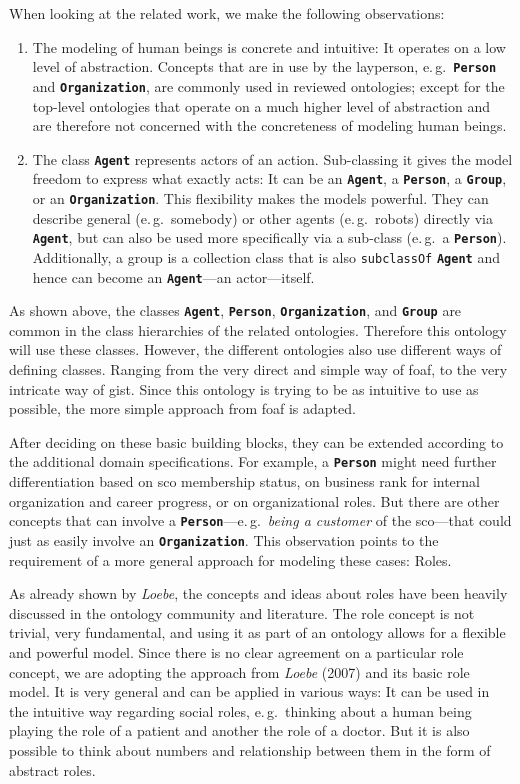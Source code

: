 \documentclass[a4paper, DIV=13, BCOR=0cm]{scrbook}
\newcommand{\eg}{e.\,g.\ }
\newcommand{\class}[1]{\texttt{\textbf{#1}}}
\newcommand{\relation}[1]{\texttt{#1}}
\begin{document}
When looking at the related work, we make the following observations:
\begin{enumerate}
	\item The modeling of human beings is concrete and intuitive: It operates on a low level of abstraction. Concepts that are in use by the layperson, \eg \class{Person} and \class{Organization}, are commonly used in reviewed ontologies; except for the top-level ontologies that operate on a much higher level of abstraction and are therefore not concerned with the concreteness of modeling human beings.
	\item The class \class{Agent} represents actors of an action. Sub-classing it gives the model freedom to express what exactly acts: It can be an \class{Agent}, a \class{Person}, a \class{Group}, or an \class{Organization}. This flexibility makes the models powerful. They can describe general (\eg somebody) or other agents (\eg robots) directly via \class{Agent}, but can also be used more specifically via a sub-class (\eg a \class{Person}). Additionally, a group is a collection class that is also \relation{subclassOf} \class{Agent} and hence can become an \class{Agent}---an actor---itself.
\end{enumerate}

As shown above, the classes \class{Agent}, \class{Person}, \class{Organization}, and \class{Group} are common in the class hierarchies of the related ontologies. Therefore this ontology will use these classes. However, the different ontologies also use different ways of defining classes. Ranging from the very direct and simple way of \gls{foaf}, to the very intricate way of \gls{gist}. Since this ontology is trying to be as intuitive to use as possible, the more simple approach from \gls{foaf} is adapted.

After deciding on these basic building blocks, they can be extended according to the additional domain specifications. For example, a \class{Person} might need further differentiation based on \gls{sco} membership status, on business rank for internal organization and career progress, or on organizational roles. But there are other concepts that can involve a \class{Person}---\eg \textit{being a customer} of the \gls{sco}---that could just as easily involve an \class{Organization}. This observation points to the requirement of a more general approach for modeling these cases: Roles.

As already shown by \textit{Loebe}, the concepts and ideas about roles have been heavily discussed in the ontology community and literature. \cite[p.\,130~1.2]{loebe2007abstract} The role concept is not trivial, very fundamental, and using it as part of an ontology allows for a flexible and powerful model.
Since there is no clear agreement on a particular role concept, we are adopting the approach from \textit{Loebe} (2007) and its basic role model. It is very general and can be applied in various ways: It can be used in the intuitive way regarding social roles, \eg thinking about a human being playing the role of a patient and another the role of a doctor. But it is also possible to think about numbers and relationship between them in the form of abstract roles. \cite[p.\,131--133]{loebe2007abstract}
\end{document}
